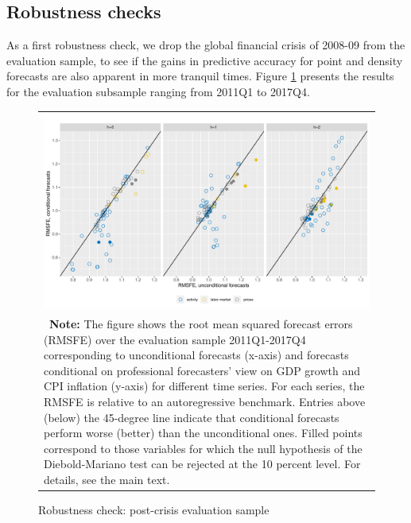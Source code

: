 \documentclass[notitlepage,a4paper,12pt]{article}
\begin{document}
\subsection{Robustness checks}

As a first robustness check, we drop the global financial crisis of 2008-09 from the evaluation sample, to see if the gains in predictive accuracy for point and density forecasts are also apparent in more tranquil times. Figure \ref{fig:postcrisis} presents the results for the evaluation subsample ranging from 2011Q1 to 2017Q4.\\ 

\begin{figure}[htbp] \centering
    \caption{Robustness check: post-crisis evaluation sample \label{fig:postcrisis}}
    \footnotesize
    \begin{tabular}{p{16cm}}
        \multicolumn{1}{c}{\includegraphics*[scale = 0.6]{../figures/fig_eval_postcrisis.pdf}} \\
        {
        \footnotesize \textbf{Note:} The figure shows the root mean squared forecast errors (RMSFE) over the evaluation sample 2011Q1-2017Q4 corresponding to unconditional forecasts (x-axis) and forecasts conditional on professional forecasters' view on GDP growth and CPI inflation (y-axis) for different time series. For each series, the RMSFE is relative to an autoregressive benchmark. Entries above (below) the 45-degree line indicate that conditional forecasts perform worse (better) than the unconditional ones. Filled points correspond to those variables for which the null hypothesis of the Diebold-Mariano test can be rejected at the 10 percent level. For details, see the main text. 
        }
        \end{tabular}
    \newline
    \normalsize
\end{figure}
\end{document}
